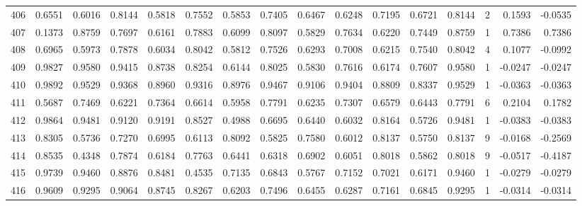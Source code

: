 \begin{tabular}{lrrrrrrrrrrrrrrr}
406 &      0.6551 &  0.6016 &  0.8144 &  0.5818 &  0.7552 &  0.5853 &  0.7405 &  0.6467 &  0.6248 &  0.7195 &   0.6721 &     0.8144 &      2 &                    0.1593 &                    -0.0535 \\
407 &      0.1373 &  0.8759 &  0.7697 &  0.6161 &  0.7883 &  0.6099 &  0.8097 &  0.5829 &  0.7634 &  0.6220 &   0.7449 &     0.8759 &      1 &                    0.7386 &                     0.7386 \\
408 &      0.6965 &  0.5973 &  0.7878 &  0.6034 &  0.8042 &  0.5812 &  0.7526 &  0.6293 &  0.7008 &  0.6215 &   0.7540 &     0.8042 &      4 &                    0.1077 &                    -0.0992 \\
409 &      0.9827 &  0.9580 &  0.9415 &  0.8738 &  0.8254 &  0.6144 &  0.8025 &  0.5830 &  0.7616 &  0.6174 &   0.7607 &     0.9580 &      1 &                   -0.0247 &                    -0.0247 \\
410 &      0.9892 &  0.9529 &  0.9368 &  0.8960 &  0.9316 &  0.8976 &  0.9467 &  0.9106 &  0.9404 &  0.8809 &   0.8337 &     0.9529 &      1 &                   -0.0363 &                    -0.0363 \\
411 &      0.5687 &  0.7469 &  0.6221 &  0.7364 &  0.6614 &  0.5958 &  0.7791 &  0.6235 &  0.7307 &  0.6579 &   0.6443 &     0.7791 &      6 &                    0.2104 &                     0.1782 \\
412 &      0.9864 &  0.9481 &  0.9120 &  0.9191 &  0.8527 &  0.4988 &  0.6695 &  0.6440 &  0.6032 &  0.8164 &   0.5726 &     0.9481 &      1 &                   -0.0383 &                    -0.0383 \\
413 &      0.8305 &  0.5736 &  0.7270 &  0.6995 &  0.6113 &  0.8092 &  0.5825 &  0.7580 &  0.6012 &  0.8137 &   0.5750 &     0.8137 &      9 &                   -0.0168 &                    -0.2569 \\
414 &      0.8535 &  0.4348 &  0.7874 &  0.6184 &  0.7763 &  0.6441 &  0.6318 &  0.6902 &  0.6051 &  0.8018 &   0.5862 &     0.8018 &      9 &                   -0.0517 &                    -0.4187 \\
415 &      0.9739 &  0.9460 &  0.8876 &  0.8481 &  0.4535 &  0.7135 &  0.6843 &  0.5767 &  0.7152 &  0.7021 &   0.6171 &     0.9460 &      1 &                   -0.0279 &                    -0.0279 \\
416 &      0.9609 &  0.9295 &  0.9064 &  0.8745 &  0.8267 &  0.6203 &  0.7496 &  0.6455 &  0.6287 &  0.7161 &   0.6845 &     0.9295 &      1 &                   -0.0314 &                    -0.0314 \\

\end{tabular}
